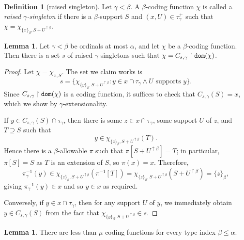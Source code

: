 \documentclass{article}
\theoremstyle{definition}
\newtheorem{lemma}[theorem]{Lemma}
\newtheorem{definition}[theorem]{Definition}
\theoremstyle{remark}
\begin{document}
\begin{definition}[raised singleton]\label{def:raised_singleton}
  Let $\gamma < \beta$.
  A $\beta$-coding function $\chi$ is called a {\em raised $\gamma$-singleton\/} if there is a $\beta$-support $S$ and $(x,U) \in \tau_{\gamma}^+$ such that $\chi = \chi_{\{x\}_\beta,S + U^{\uparrow \beta}}$.
\end{definition}
\begin{lemma}\label{lem:eq_combine}
  Let $\gamma < \beta$ be ordinals at most $\alpha$, and let $\chi$ be a $\beta$-coding function.
  Then there is a set $s$ of raised $\gamma$-singletons such that $\chi = C_{s,\gamma} \restriction {\tt dom}(\chi)$.
\end{lemma}
\begin{proof}
  Let $\chi = \chi_{x,S}$.
  The set we claim works is
  $$ s = \{ \chi_{\{y\}_\beta,S + U^{\uparrow \beta}} : y \in x \cap \tau_\gamma \wedge U \text{ supports } y \}. $$
  Since $C_{s,\gamma} \restriction {\tt dom}(\chi)$ is a coding function, it suffices to check that $C_{s,\gamma}(S) = x$, which we show by $\gamma$-extensionality.

  If $y \in C_{s,\gamma}(S) \cap \tau_\gamma$, then there is some $z \in x \cap \tau_\gamma$, some support $U$ of $z$, and $T \supseteq S$ such that
  $$ y \in \chi_{\{z\}_\beta,S + U^{\uparrow \beta}}(T). $$
  Hence there is a $\beta$-allowable $\pi$ such that $\pi[S + U^{\uparrow \beta}] = T$; in particular, $\pi[S] = S$ as $T$ is an extension of $S$, so $\pi(x) = x$.
  Therefore,
  $$ \pi_\gamma^{-1}(y) \in \chi_{\{z\}_\beta,S + U^{\uparrow \beta}}(\pi^{-1}[T]) = \chi_{\{z\}_\beta,S + U^{\uparrow \beta}}(S + U^{\uparrow \beta}) = \{z\}_\beta, $$
  giving $\pi_\gamma^{-1}(y) \in x$ and so $y \in x$ as required.

  Conversely, if $y \in x \cap \tau_\gamma$, then for any support $U$ of $y$, we immediately obtain $y \in C_{s,\gamma}(S)$ from the fact that $\chi_{\{y\}_\beta,S + U^{\uparrow \beta}} \in s$.
\end{proof}
\begin{lemma}\label{lem:count_coding_function}
  There are less than $\mu$ coding functions for every type index $\beta \leq \alpha$.
\end{lemma}
\end{document}
